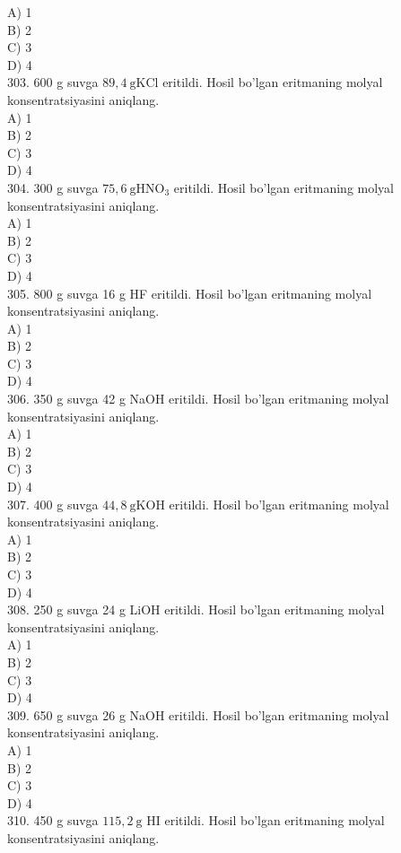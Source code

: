 A) 1\\
B) 2\\
C) 3\\
D) 4\\
303. 600 g suvga $89,4 \mathrm{~g} \mathrm{KCl}$ eritildi. Hosil bo'lgan eritmaning molyal konsentratsiyasini aniqlang.\\
A) 1\\
B) 2\\
C) 3\\
D) 4\\
304. 300 g suvga $75,6 \mathrm{~g} \mathrm{HNO}_{3}$ eritildi. Hosil bo'lgan eritmaning molyal konsentratsiyasini aniqlang.\\
A) 1\\
B) 2\\
C) 3\\
D) 4\\
305. 800 g suvga 16 g HF eritildi. Hosil bo'lgan eritmaning molyal konsentratsiyasini aniqlang.\\
A) 1\\
B) 2\\
C) 3\\
D) 4\\
306. 350 g suvga 42 g NaOH eritildi. Hosil bo'lgan eritmaning molyal konsentratsiyasini aniqlang.\\
A) 1\\
B) 2\\
C) 3\\
D) 4\\
307. 400 g suvga $44,8 \mathrm{~g} \mathrm{KOH}$ eritildi. Hosil bo'lgan eritmaning molyal konsentratsiyasini aniqlang.\\
A) 1\\
B) 2\\
C) 3\\
D) 4\\
308. 250 g suvga 24 g LiOH eritildi. Hosil bo'lgan eritmaning molyal konsentratsiyasini aniqlang.\\
A) 1\\
B) 2\\
C) 3\\
D) 4\\
309. 650 g suvga 26 g NaOH eritildi. Hosil bo'lgan eritmaning molyal konsentratsiyasini aniqlang.\\
A) 1\\
B) 2\\
C) 3\\
D) 4\\
310. 450 g suvga $115,2 \mathrm{~g}$ HI eritildi. Hosil bo'lgan eritmaning molyal konsentratsiyasini aniqlang.\\
